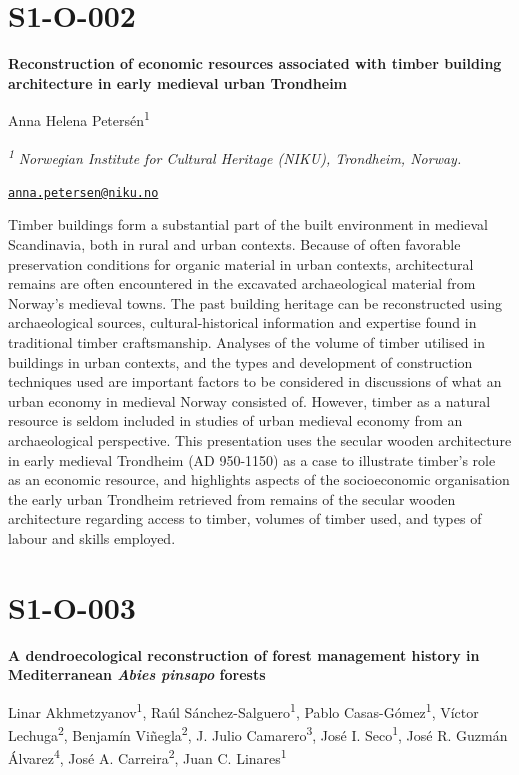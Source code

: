 \documentclass[
]{book}
\begin{document}
\hypertarget{s1-o-002}{%
\section*{S1-O-002}\label{s1-o-002}}

\textbf{Reconstruction of economic resources associated with timber building architecture in early medieval urban Trondheim}

Anna Helena Petersén\textsuperscript{1}

\textsuperscript{\emph{1}} \emph{Norwegian Institute for Cultural Heritage (NIKU), Trondheim, Norway.}

\href{mailto:anna.petersen@niku.no}{\nolinkurl{anna.petersen@niku.no}}

Timber buildings form a substantial part of the built environment in medieval Scandinavia, both in rural and urban contexts. Because of often favorable preservation conditions for organic material in urban contexts, architectural remains are often encountered in the excavated archaeological material from Norway's medieval towns. The past building heritage can be reconstructed using archaeological sources, cultural-historical information and expertise found in traditional timber craftsmanship. Analyses of the volume of timber utilised in buildings in urban contexts, and the types and development of construction techniques used are important factors to be considered in discussions of what an urban economy in medieval Norway consisted of. However, timber as a natural resource is seldom included in studies of urban medieval economy from an archaeological perspective. This presentation uses the secular wooden architecture in early medieval Trondheim (AD 950-1150) as a case to illustrate timber's role as an economic resource, and highlights aspects of the socioeconomic organisation the early urban Trondheim retrieved from remains of the secular wooden architecture regarding access to timber, volumes of timber used, and types of labour and skills employed.

\hypertarget{s1-o-003}{%
\section*{S1-O-003}\label{s1-o-003}}

\textbf{A dendroecological reconstruction of forest management history in Mediterranean \emph{Abies pinsapo} forests}

Linar Akhmetzyanov\textsuperscript{1}, Raúl Sánchez-Salguero\textsuperscript{1}, Pablo Casas-Gómez\textsuperscript{1}, Víctor Lechuga\textsuperscript{2}, Benjamín Viñegla\textsuperscript{2}, J. Julio Camarero\textsuperscript{3}, José I. Seco\textsuperscript{1}, José R. Guzmán Álvarez\textsuperscript{4}, José A. Carreira\textsuperscript{2}, Juan C. Linares\textsuperscript{1}
\end{document}
